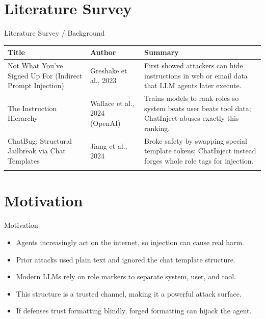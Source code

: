\documentclass[10pt]{beamer}
\begin{document}
\section{Literature Survey}
\begin{frame}{Literature Survey / Background}
  \small
  \begin{tabular}{@{}p{2.7cm}p{2.3cm}p{5.6cm}@{}}
    \toprule
    \textbf{Title} & \textbf{Author} & \textbf{Summary} \\
    \midrule
    Not What You've Signed Up For (Indirect Prompt Injection) & Greshake et al., 2023 & First showed attackers can hide instructions in web or email data that LLM agents later execute. \\
    \addlinespace
    The Instruction Hierarchy & Wallace et al., 2024 (OpenAI) & Trains models to rank roles so system beats user beats tool data; ChatInject abuses exactly this ranking. \\
    \addlinespace
    ChatBug: Structural Jailbreak via Chat Templates & Jiang et al., 2024 & Broke safety by swapping special template tokens; ChatInject instead forges whole role tags for injection. \\
    \addlinespace
    \bottomrule
  \end{tabular}
\end{frame}
\section{Motivation}
\begin{frame}{Motivation}
\begin{itemize}
  \item Agents increasingly act on the internet, so injection can cause real harm.
  \item Prior attacks used plain text and ignored the chat template structure.
  \item Modern LLMs rely on role markers to separate system, user, and tool.
  \item This structure is a trusted channel, making it a powerful attack surface.
  \item If defenses trust formatting blindly, forged formatting can hijack the agent.
\end{itemize}
\end{frame}
\end{document}
